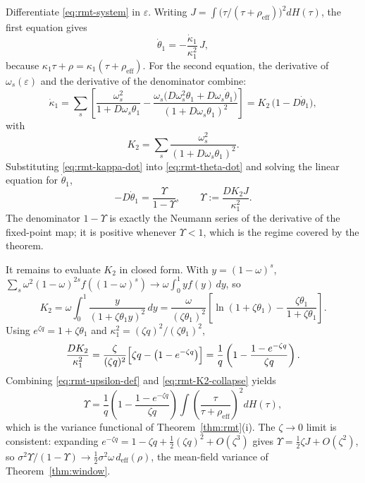Differentiate \eqref{eq:rmt-system} in $\varepsilon$.
Writing $J = \int \bigl(\tau/(\tau + \rho_{\mathrm{eff}})\bigr)^2 dH(\tau)$, the first equation gives
\begin{equation}
\label{eq:rmt-theta-dot}
\dot\theta_1 = -\frac{\dot\kappa_1}{\kappa_1^2}\,J,
\end{equation}
because $\kappa_1\tau + \rho = \kappa_1(\tau + \rho_{\mathrm{eff}})$.
For the second equation, the derivative of $\omega_s(\varepsilon)$ and the derivative of the denominator combine:
\begin{equation}
\label{eq:rmt-kappa-dot}
\dot\kappa_1
= \sum_s \left[
\frac{\omega_s^2}{1 + D \omega_s \theta_1}
- \frac{\omega_s \bigl(D \omega_s^2 \theta_1 + D \omega_s \dot\theta_1\bigr)}{(1 + D \omega_s \theta_1)^2}
\right]
= K_2\,\bigl(1 - D\dot\theta_1\bigr),
\end{equation}
with
\begin{equation}
\label{eq:rmt-K2}
K_2 = \sum_s \frac{\omega_s^2}{(1 + D \omega_s \theta_1)^2}.
\end{equation}
Substituting \eqref{eq:rmt-kappa-dot} into \eqref{eq:rmt-theta-dot} and solving the linear equation for $\dot\theta_1$,
\begin{equation}
\label{eq:rmt-upsilon-def}
-D\dot\theta_1
= \frac{\Upsilon}{1 - \Upsilon},
\qquad
\Upsilon := \frac{D K_2 J}{\kappa_1^2}.
\end{equation}
The denominator $1-\Upsilon$ is exactly the Neumann series of the derivative of the fixed-point map; it is positive whenever $\Upsilon < 1$, which is the regime covered by the theorem.

It remains to evaluate $K_2$ in closed form.
With $y = (1-\omega)^s$, $\sum_s \omega^2 (1-\omega)^{2s} f((1-\omega)^s) \to \omega\int_0^1 y f(y)\,dy$, so
\begin{equation}
\label{eq:rmt-K2-integral}
K_2
= \omega\int_0^1 \frac{y}{(1 + \zeta \theta_1 y)^2}\,dy
= \frac{\omega}{(\zeta \theta_1)^2}
\left[\ln(1 + \zeta \theta_1) - \frac{\zeta \theta_1}{1 + \zeta \theta_1}\right].
\end{equation}
Using $e^{\zeta q} = 1 + \zeta \theta_1$ and $\kappa_1^2 = (\zeta q)^2/(\zeta \theta_1)^2$,
\begin{equation}
\label{eq:rmt-K2-collapse}
\frac{D K_2}{\kappa_1^2}
= \frac{\zeta}{(\zeta q)^2}\Bigl[\zeta q - \bigl(1 - e^{-\zeta q}\bigr)\Bigr]
= \frac{1}{q}\left(1 - \frac{1 - e^{-\zeta q}}{\zeta q}\right).
\end{equation}
Combining \eqref{eq:rmt-upsilon-def} and \eqref{eq:rmt-K2-collapse} yields
\begin{equation}
\label{eq:rmt-upsilon}
\Upsilon
= \frac{1}{q}\left(1 - \frac{1 - e^{-\zeta q}}{\zeta q}\right)
\int \left(\frac{\tau}{\tau + \rho_{\mathrm{eff}}}\right)^{2} dH(\tau),
\end{equation}
which is the variance functional of Theorem~\ref{thm:rmt}(i).
The $\zeta \to 0$ limit is consistent: expanding $e^{-\zeta q} = 1 - \zeta q + \tfrac12(\zeta q)^2 + O(\zeta^3)$ gives $\Upsilon = \tfrac12\zeta J + O(\zeta^2)$, so $\sigma^2\Upsilon/(1-\Upsilon) \to \tfrac12\sigma^2\omega\,d_{\mathrm{eff}}(\rho)$, the mean-field variance of Theorem~\ref{thm:window}.

